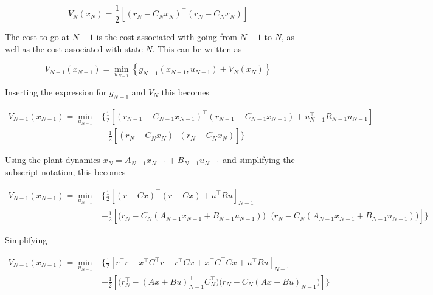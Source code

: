 \documentclass[11pt,letterpaper,onecolumn,notitlepage]{article}
\begin{document}
  \begin{equation*}
    V_{N}(x_{N})=\frac{1}{2}\left[(r_{N}-C_{N}x_{N})^{\top}(r_{N}-C_{N}x_{N})\right]
  \end{equation*}

  The cost to go at $N-1$ is the cost associated with going from $N-1$ to $N$, as well as the cost associated with state $N$.
  This can be written as

  \begin{equation*}
    V_{N-1}(x_{N-1})=\min_{u_{N-1}}\left\{g_{N-1}(x_{N-1},u_{N-1})+V_{N}(x_{N})\right\}
  \end{equation*}

  Inserting the expression for $g_{N-1}$ and $V_{N}$ this becomes

  \begin{equation*}
    \begin{split}
      V_{N-1}(x_{N-1})=\min_{u_{N-1}}&\biggr\{\frac{1}{2}\left[(r_{N-1}-C_{N-1}x_{N-1})^{\top}(r_{N-1}-C_{N-1}x_{N-1})+u_{N-1}^{\top}R_{N-1}u_{N-1}\right] \\
      &+\frac{1}{2}\left[(r_{N}-C_{N}x_{N})^{\top}(r_{N}-C_{N}x_{N})\right]\biggr\}
    \end{split}
  \end{equation*}

  Using the plant dynamics $x_{N}=A_{N-1}x_{N-1}+B_{N-1}u_{N-1}$ and simplifying the subscript notation, this becomes

  \begin{equation*}
    \begin{split}
      V_{N-1}(x_{N-1})=\min_{u_{N-1}}&\biggr\{\frac{1}{2}\left[(r-Cx)^{\top}(r-Cx)+u^{\top}Ru\right]_{N-1} \\
      &+\frac{1}{2}\left[\bigr(r_{N}-C_{N}(A_{N-1}x_{N-1}+B_{N-1}u_{N-1})\bigr)^{\top}\bigr(r_{N}-C_{N}(A_{N-1}x_{N-1}+B_{N-1}u_{N-1})\bigr)\right]\biggr\}
    \end{split}
  \end{equation*}

  Simplifying

  \begin{equation*}
    \begin{split}
      V_{N-1}(x_{N-1})=\min_{u_{N-1}}&\biggr\{\frac{1}{2}\left[r^{\top}r-x^{\top}C^{\top}r-r^{\top}Cx+x^{\top}C^{\top}Cx+u^{\top}Ru\right]_{N-1} \\
      &+\frac{1}{2}\left[\bigr(r_{N}^{\top}-(Ax+Bu)_{N-1}^{\top}C_{N}^{\top}\bigr)\bigr(r_{N}-C_{N}(Ax+Bu)_{N-1}\bigr)\right]\biggr\}
    \end{split}
  \end{equation*}
\end{document}
